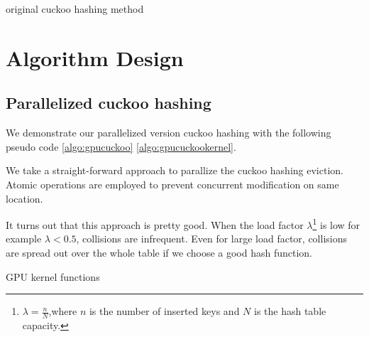 \documentclass{article}
\newcommand{\reportSection}[1]{
   \pagebreak
   \section{#1}
   \chead{section \emph{#1}}
}
\begin{document}
\begin{algorithm}[htbp]
	\caption{original cuckoo hashing method}
	\label{algo:cuckoo}

\end{algorithm}

\reportSection{Algorithm Design}

\subsection{Parallelized cuckoo hashing}

We demonstrate our parallelized version cuckoo hashing with the following pseudo code \ref{algo:gpucuckoo} \ref{algo:gpucuckookernel}.\par
We take a straight-forward approach to parallize the cuckoo hashing eviction.
Atomic operations are employed to prevent concurrent modification on same location.\par
It turns out that this approach is pretty good.
When the load factor $\lambda$\footnote{$\lambda=\frac{n}{N}$,where $n$ is the number of inserted keys and $N$ is the hash table capacity.} is low for example $\lambda<0.5$, collisions are infrequent. Even for large load factor, collisions are spread out over the whole table if we choose a good hash function.

\begin{algorithm}[htbp]
	\caption{GPU kernel functions}
	\label{algo:gpucuckookernel}
\end{algorithm}
\end{document}
